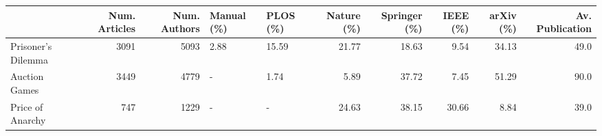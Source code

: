 \begin{tabular}{lrrllrrrrr}
\toprule
{} &  Num. Articles &  Num. Authors & Manual (\%) & PLOS (\%) &  Nature (\%) &  Springer (\%) &  IEEE (\%) &  arXiv (\%) &  Av. Publication \\
\midrule
Prisoner's Dilemma &           3091 &          5093 &       2.88 &    15.59 &       21.77 &         18.63 &      9.54 &      34.13 &             49.0 \\
Auction Games      &           3449 &          4779 &          - &     1.74 &        5.89 &         37.72 &      7.45 &      51.29 &             90.0 \\
Price of Anarchy   &            747 &          1229 &          - &        - &       24.63 &         38.15 &     30.66 &       8.84 &             39.0 \\
\bottomrule
\end{tabular}
